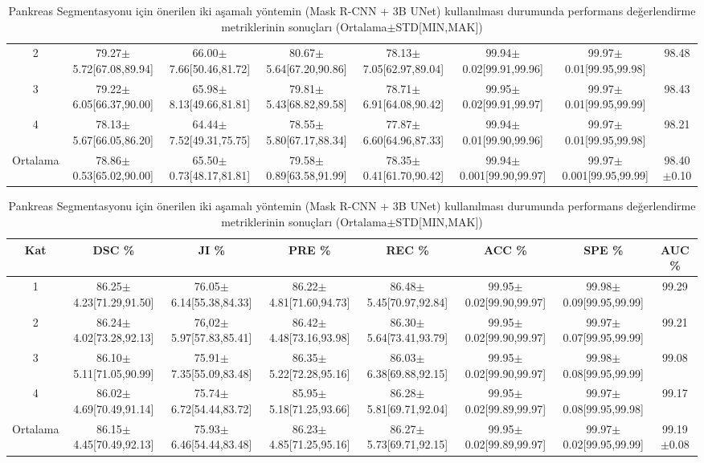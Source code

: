 \begin{table}
\begin{adjustbox}{width=\textwidth}
\begin{tabular}{cccccccc}
			2       & 79.27$\pm$5.72[67.08,89.94] & 66.00$\pm$7.66[50.46,81.72] & 80.67$\pm$5.64[67.20,90.86] & 78.13$\pm$7.05[62.97,89.04] & 99.94$\pm$0.02[99.91,99.96] & 99.97$\pm$0.01[99.95,99.98] & 98.48      \\
			3       & 79.22$\pm$6.05[66.37,90.00] & 65.98$\pm$8.13[49.66,81.81] & 79.81$\pm$5.43[68.82,89.58] & 78.71$\pm$6.91[64.08,90.42] & 99.95$\pm$0.02[99.91,99.97] & 99.97$\pm$0.01[99.95,99.99] & 98.43      \\
			4       & 78.13$\pm$5.67[66.05,86.20] & 64.44$\pm$7.52[49.31,75.75] & 78.55$\pm$5.80[67.17,88.34] & 77.87$\pm$6.60[64.96,87.33] & 99.94$\pm$0.01[99.90,99.96] & 99.97$\pm$0.01[99.95,99.98] & 98.21      \\
			\toprule
			Ortalama & 78.86$\pm$0.53[65.02,90.00] & 65.50$\pm$0.73[48.17,81.81] & 79.58$\pm$0.89[63.58,91.99] & 78.35$\pm$0.41[61.70,90.42] & 99.94$\pm$0.001[99.90,99.97] & 99.97$\pm$0.001[99.95,99.99] & 98.40$\pm$0.10 \\
			\bottomrule
		\end{tabular}
	\end{adjustbox}
	\vspace{2\baselineskip}
	\caption{Pankreas Segmentasyonu için önerilen iki aşamalı yöntemin (Mask R-CNN + 3B UNet) kullanılması durumunda performans değerlendirme metriklerinin sonuçları (Ortalama$\pm$STD[MIN,MAK])}
	\label{tab:twop_result}
	\begin{adjustbox}{width=\textwidth}		
		\begin{tabular}{cccccccc}
			\toprule
			Kat   &  DSC \%       &  JI  \%   &  PRE  \%   &  REC  \%  & ACC  \%  &  SPE  \% &  AUC  \% \\ 
			\midrule 
			1      &  86.25$\pm$4.23[71.29,91.50] & 76.05$\pm$6.14[55.38,84.33] &  86.22$\pm$4.81[71.60,94.73]  & 86.48$\pm$5.45[70.97,92.84] &  99.95$\pm$0.02[99.90,99.97]  & 99.98$\pm$0.09[99.95,99.99]  & 99.29\\ 
			2      &  86.24$\pm$4.02[73.28,92.13] &  76,02$\pm$5.97[57.83,85.41] &              86.42$\pm$4.48[73.16,93.98]  & 86.30$\pm$5.64[73.41,93.79] & 99.95$\pm$0.02[99.90,99.97]  & 99.97$\pm$0.07[99.95,99.99]  & 99.21 \\
			3      &  86.10$\pm$5.11[71.05,90.99] &  75.91$\pm$7.35[55.09,83.48] &     86.35$\pm$5.22[72.28,95.16]  & 86.03$\pm$6.38[69.88,92.15] & 99.95$\pm$0.02[99.90,99.97]  & 99.98$\pm$0.08[99.95,99.99]  & 99.08 \\
			4      &  86.02$\pm$4.69[70.49,91.14] &  75.74$\pm$6.72[54.44,83.72] &  85.95$\pm$5.18[71.25,93.66]  & 86.28$\pm$5.81[69.71,92.04] & 99.95$\pm$0.02[99.89,99.97]  & 99.97$\pm$0.08[99.95,99.98]  & 99.17 \\ 
			\toprule
			Ortalama&  86.15$\pm$4.45[70.49,92.13] &  75.93$\pm$6.46[54.44,83.48] &  86.23$\pm$4.85[71.25,95.16]  & 86.27$\pm$5.73[69.71,92.15] &  99.95$\pm$0.02[99.89,99.97]  & 99.97$\pm$0.02[99.95,99.99]  & 99.19 $\pm$0.08  \\
			\bottomrule
		\end{tabular}
	\end{adjustbox}
\end{table}

